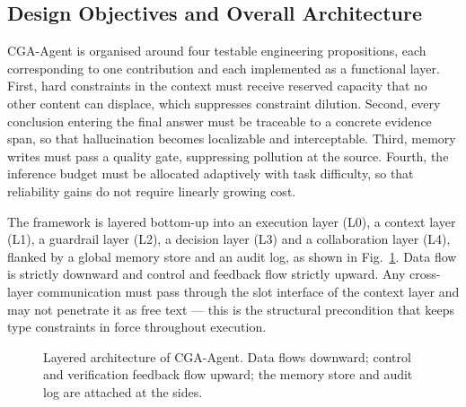 \documentclass[journal,10pt,a4paper]{IEEEtran}
\begin{document}
\subsection{Design Objectives and Overall Architecture}
CGA-Agent is organised around four testable engineering propositions, each corresponding to one contribution and each implemented as a functional layer. First, hard constraints in the context must receive reserved capacity that no other content can displace, which suppresses constraint dilution. Second, every conclusion entering the final answer must be traceable to a concrete evidence span, so that hallucination becomes localizable and interceptable. Third, memory writes must pass a quality gate, suppressing pollution at the source. Fourth, the inference budget must be allocated adaptively with task difficulty, so that reliability gains do not require linearly growing cost.

The framework is layered bottom-up into an execution layer (L0), a context layer (L1), a guardrail layer (L2), a decision layer (L3) and a collaboration layer (L4), flanked by a global memory store and an audit log, as shown in Fig.~\ref{fig:arch}. Data flow is strictly downward and control and feedback flow strictly upward. Any cross-layer communication must pass through the slot interface of the context layer and may not penetrate it as free text --- this is the structural precondition that keeps type constraints in force throughout execution.

\begin{figure}[t]
\centering
{}
\caption{Layered architecture of CGA-Agent. Data flows downward; control and verification feedback flow upward; the memory store and audit log are attached at the sides.}
\label{fig:arch}
\end{figure}
\end{document}
